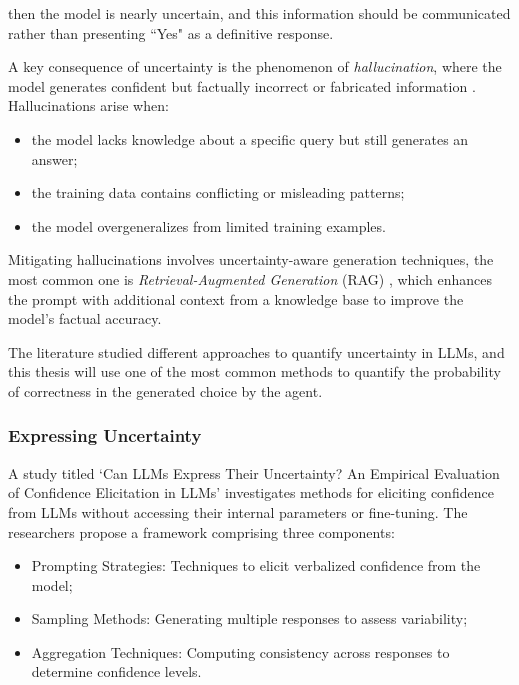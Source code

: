then the model is nearly uncertain, and this information should be communicated
rather than presenting ``Yes" as a definitive response.

A key consequence of uncertainty is the phenomenon of \emph{hallucination}, where
the model generates confident but factually incorrect or fabricated information \cite{Ji_2023}.
Hallucinations arise when:
\begin{itemize}
  \item the model lacks knowledge about a specific query but still generates an answer;

  \item the training data contains conflicting or misleading patterns;

  \item the model overgeneralizes from limited training examples.
\end{itemize}

Mitigating hallucinations involves uncertainty-aware generation techniques, the most
common one is \emph{Retrieval-Augmented Generation} (RAG)
\cite{lewis2021retrievalaugmentedgenerationknowledgeintensivenlp}, which enhances
the prompt with additional context from a knowledge base to improve the model's factual
accuracy.

The literature studied different approaches to quantify uncertainty in LLMs, and
this thesis will use one of the most common methods to quantify the probability
of correctness in the generated choice by the agent.

\subsubsection{Expressing Uncertainty}
A study titled `Can LLMs Express Their Uncertainty? An Empirical Evaluation of
Confidence Elicitation in LLMs' \cite{xiong2024llmsexpressuncertaintyempirical} investigates
methods for eliciting confidence from LLMs without accessing their internal parameters
or fine-tuning. The researchers propose a framework comprising three components:
\begin{itemize}
  \item Prompting Strategies: Techniques to elicit verbalized confidence from
    the model;

  \item Sampling Methods: Generating multiple responses to assess variability;

  \item Aggregation Techniques: Computing consistency across responses to
    determine confidence levels.
\end{itemize}

